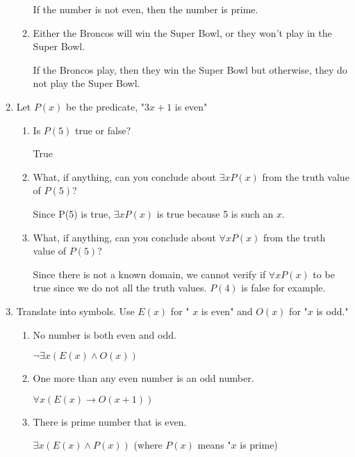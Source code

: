 \documentclass[11pt, a4paper]{article}
\newcommand\setItemNumber[1]{\setcounter{enumi}{\numexpr#1-1\relax}}
\begin{document}
\begin{enumerate}
\begin{enumerate}
                If the number is not even, then the number is prime.

            \item Either the Broncos will win the Super Bowl, or they won’t play in the Super Bowl.

If the Broncos play, then they win the Super Bowl but otherwise, they do not play the Super Bowl.
        \end{enumerate}

    \setItemNumber{12}
    \item Let $P(x)$ be the predicate, "$3x + 1$ is even"
        \begin{enumerate}
            \item Is $P(5)$ true or false?

                True

            \item What, if anything, can you conclude about $\exists xP(x)$ from the truth value of $P(5)$?

                Since P(5) is true, $\exists xP(x)$ is true because 5 is such an $x$.

            \item What, if anything, can you conclude about $\forall xP(x)$ from the truth value of $P(5)$?

                Since there is not a known domain, we cannot verify if $\forall xP(x)$ to be true since we do not all the truth values. $P(4)$ is false for example.

        \end{enumerate}

    \setItemNumber{16}
    \item Translate into symbols. Use $E(x)$ for " $x$ is even" and $O(x)$ for "$x$ is odd."
        \begin{enumerate}
            \item No number is both even and odd.

                $\neg \exists x(E(x) \land O(x))$

            \item One more than any even number is an odd number.

                $\forall x(E(x) \rightarrow O(x + 1))$

            \item There is prime number that is even.

                $\exists x(E(x) \land P(x))$ (where $P(x)$ means "$x$ is prime)


\end{enumerate}
\end{enumerate}
\end{document}
